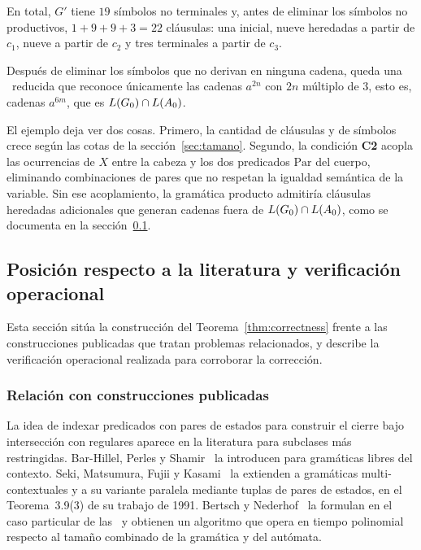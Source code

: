 En total, $G'$ tiene $19$ símbolos no terminales y, antes de eliminar los símbolos no productivos, $1 + 9 + 9 + 3 = 22$ cláusulas: una inicial, nueve heredadas a partir de $c_1$, nueve a partir de $c_2$ y tres terminales a partir de $c_3$.

Después de eliminar los símbolos que no derivan en ninguna cadena, queda una \PRCG\ reducida que reconoce únicamente las cadenas $a^{2n}$ con $2n$ múltiplo de $3$, esto es, cadenas $a^{6m}$, que es $L(G_0) \cap L(A_0)$.

El ejemplo deja ver dos cosas. Primero, la cantidad de cláusulas y de símbolos crece según las cotas de la sección~\ref{sec:tamano}. Segundo, la condición \textbf{C2} acopla las ocurrencias de $X$ entre la cabeza y los dos predicados $\mathrm{Par}$ del cuerpo, eliminando combinaciones de pares que no respetan la igualdad semántica de la variable. Sin ese acoplamiento, la gramática producto admitiría cláusulas heredadas adicionales que generan cadenas fuera de $L(G_0) \cap L(A_0)$, como se documenta en la sección~\ref{sec:literatura}.

\subsection{Posición respecto a la literatura y verificación operacional}\label{sec:literatura}

Esta sección sitúa la construcción del Teorema~\ref{thm:correctness} frente a las construcciones publicadas que tratan problemas relacionados, y describe la verificación operacional realizada para corroborar la corrección.

\subsubsection{Relación con construcciones publicadas}

La idea de indexar predicados con pares de estados para construir el cierre bajo intersección con regulares aparece en la literatura para subclases más restringidas. Bar-Hillel, Perles y Shamir~\cite{REF} la introducen para gramáticas libres del contexto. Seki, Matsumura, Fujii y Kasami~\cite{REF} la extienden a gramáticas multi-contextuales y a su variante paralela mediante tuplas de pares de estados, en el Teorema~3.9(3) de su trabajo de 1991. Bertsch y Nederhof~\cite{REF} la formulan en el caso particular de las \sRCG\ y obtienen un algoritmo que opera en tiempo polinomial respecto al tamaño combinado de la gramática y del autómata.

